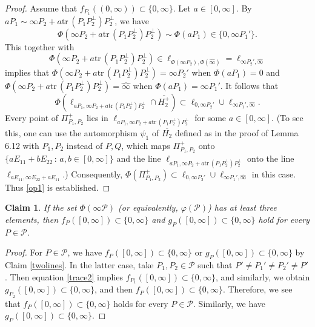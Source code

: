\documentclass[10pt]{amsart}
\newtheorem{claim}[theorem]{Claim}
\theoremstyle{definition}
\theoremstyle{remark}
\numberwithin{subsection}{section}
\numberwithin{equation}{section}
\newcommand\cP{{\mathcal{P}}}
\newcommand\oH{{\overline{H_2}}}
\newcommand\oHp{{\overline{H_2^+}}}
\newcommand\oi{{\widehat{\infty}}}
\newcommand\ppp{{\Pi_{P_1,P_2}^+}}
\begin{document}
\begin{proof}
Assume that $f_{P_1}((0, \infty))\subset \{0,\infty\}$. 
Let $a\in [0,\infty]$. 
By $aP_1\sim \infty P_2 + a\mathrm{tr}\,(P_1P_2^\perp) P_2^\perp$, we have
\[
\Phi(\infty P_2 + a\mathrm{tr}\,(P_1P_2^\perp) P_2^\perp)\sim \Phi(aP_1)\in \{0, \infty P_1'\}.
\]
This together with 
\[
\Phi(\infty P_2 + a\mathrm{tr}\,(P_1P_2^\perp) P_2^\perp)\in \ell_{\Phi(\infty P_2), \Phi(\oi)}=\ell_{\infty P_2', \oi}
\]
implies that $\Phi(\infty P_2 + a\mathrm{tr}\,(P_1P_2^\perp) P_2^\perp)=\infty P_2'$ when $\Phi(aP_1)=0$ and $\Phi(\infty P_2 + a\mathrm{tr}\,(P_1P_2^\perp) P_2^\perp)=\oi$ when $\Phi(aP_1)=\infty P_1'$. 
It follows that 
\[
\Phi(\ell_{aP_1, \infty P_2 + a\mathrm{tr}\,(P_1P_2^\perp) P_2^\perp}\cap \oHp)\subset \ell_{0, \infty P_2'}\cup \ell_{\infty P_1', \oi}.
\] 
Every point of $\ppp$ lies in $\ell_{aP_1, \infty P_2 + a\mathrm{tr}\,(P_1P_2^\perp) P_2^\perp}$ for some $a\in [0, \infty]$. (To see this, one can use the automorphism $\psi_1$ of $\oH$ defined as in the proof of Lemma 6.12 with $P_1 ,P_2$ instead of $P,Q$, which maps $\ppp$ onto $\{aE_{11}+bE_{22}\,:\, a, b\in [0, \infty]\}$ and the line 
$\ell_{aP_1, \infty P_2 + a\mathrm{tr}\,(P_1P_2^\perp) P_2^\perp}$ onto the line $\ell_{aE_{11}, \infty E_{22} + a E_{11}}$.)
Consequently, $\Phi(\ppp)\subset \ell_{0, \infty P_2'}\cup \ell_{\infty P_1', \oi}$ in this case. 
Thus \eqref{op1} is established.
\end{proof}





\begin{claim}\label{zeroinfty}
If the set $\Phi(\infty \cP)$ (or equivalently, $\varphi(\cP)$) has at least three elements, then $f_{P}([0, \infty])\subset \{0, \infty\}$ and $g_{P}([0, \infty])\subset \{0, \infty\}$ hold for every $P\in \cP$.
\end{claim}
\begin{proof}
For $P\in \cP$, we have $f_{P}([0, \infty])\subset \{0, \infty\}$ or $g_{P}([0, \infty])\subset \{0, \infty\}$ by Claim \ref{twolines}. 
In the latter case, take $P_1, P_2\in \cP$ such that $P'\neq P_1'\neq P_2'\neq  P'$. 
Then equation \eqref{trace2} implies $f_{P_1}([0, \infty])\subset \{0, \infty\}$, and similarly, we obtain $g_{P_2}([0, \infty])\subset \{0, \infty\}$, and then $f_{P}([0, \infty])\subset \{0, \infty\}$. 
Therefore, we see that $f_{P}([0, \infty])\subset \{0, \infty\}$ holds for every $P\in \cP$. 
Similarly, we have $g_{P}([0, \infty])\subset \{0, \infty\}$. 
\end{proof}
\end{document}
